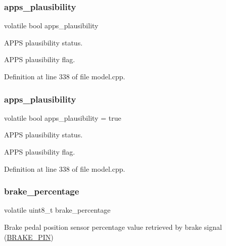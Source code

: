 \subsubsection{\texorpdfstring{apps\+\_\+plausibility}{apps\_plausibility}\hspace{0.1cm}{\footnotesize\ttfamily [1/2]}}
{\footnotesize\ttfamily volatile bool apps\+\_\+plausibility}



A\+P\+PS plausibility status. 

A\+P\+PS plausibility flag. 

Definition at line 338 of file model.\+cpp.

\mbox{\label{group___board__model__group_gaa9de48f5a49bc92a608ed315c087f3a6}} 
\subsubsection{\texorpdfstring{apps\+\_\+plausibility}{apps\_plausibility}\hspace{0.1cm}{\footnotesize\ttfamily [2/2]}}
{\footnotesize\ttfamily volatile bool apps\+\_\+plausibility = true}



A\+P\+PS plausibility status. 

A\+P\+PS plausibility flag. 

Definition at line 338 of file model.\+cpp.

\mbox{\label{group___board__model__group_ga8e50a30864da7026531520887968d4c0}} 
\subsubsection{\texorpdfstring{brake\+\_\+percentage}{brake\_percentage}\hspace{0.1cm}{\footnotesize\ttfamily [1/2]}}
{\footnotesize\ttfamily volatile uint8\+\_\+t brake\+\_\+percentage}



Brake pedal position sensor percentage value retrieved by brake signal (\mbox{\hyperlink{group___board__pinout__group_gad632b56bf4c6259a390c3db91607078e}{B\+R\+A\+K\+E\+\_\+\+P\+IN}}) 

